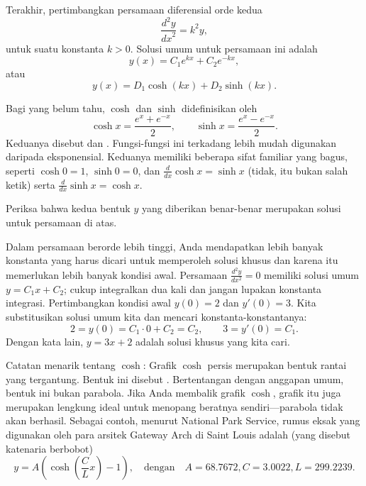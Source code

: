 Terakhir, pertimbangkan persamaan diferensial orde kedua
\begin{equation*}
\frac{d^2y}{{dx}^2} = k^2 y ,
\end{equation*}
untuk suatu konstanta $k > 0$.
Solusi umum untuk persamaan ini adalah
\begin{equation*}
y(x) = C_1 e^{kx} + C_2 e^{-kx} ,
\end{equation*}
atau
\begin{equation*}
y(x) = D_1 \cosh(kx) + D_2 \sinh(kx) .
\end{equation*}

Bagi yang belum tahu, $\cosh$ dan $\sinh$ didefinisikan oleh
\begin{equation*}
\cosh x = \frac{e^{x} + e^{-x}}{2} , \qquad
\sinh x = \frac{e^{x} - e^{-x}}{2} .
\end{equation*}
Keduanya disebut
\emph{}
dan
\emph{}.
Fungsi-fungsi ini terkadang lebih mudah
digunakan daripada eksponensial. Keduanya memiliki beberapa sifat familiar yang bagus, seperti
$\cosh 0 = 1$, $\sinh 0 = 0$, dan $\frac{d}{dx} \cosh x = \sinh x$
(tidak, itu bukan salah ketik)
serta $\frac{d}{dx} \sinh x = \cosh x$.

\begin{exercise}
Periksa bahwa kedua bentuk $y$ yang diberikan
benar-benar merupakan solusi untuk persamaan di atas.
\end{exercise}

\begin{example}
Dalam persamaan berorde lebih tinggi, Anda mendapatkan lebih banyak konstanta yang harus dicari untuk
memperoleh solusi khusus dan karena itu memerlukan lebih banyak kondisi awal.
Persamaan $\frac{d^2y}{dx^2} = 0$ memiliki
solusi umum $y = C_1 x + C_2$; cukup integralkan dua kali dan jangan lupakan
konstanta integrasi. Pertimbangkan kondisi awal $y(0) =
2$ dan $y'(0) = 3$. Kita substitusikan solusi umum kita dan mencari
konstanta-konstantanya:
\begin{equation*}
2 = y(0) = C_1 \cdot 0 + C_2 = C_2, \qquad
3 = y'(0) = C_1 .
\end{equation*}
Dengan kata lain, $y = 3x + 2$ adalah solusi khusus yang kita cari.
\end{example}


Catatan menarik tentang $\cosh$: Grafik $\cosh$ persis merupakan bentuk
rantai yang tergantung. Bentuk ini disebut
\emph{}.
Bertentangan dengan anggapan umum, bentuk ini bukan
parabola. Jika Anda membalik grafik $\cosh$, grafik itu juga merupakan lengkung ideal untuk
menopang beratnya sendiri---parabola tidak akan berhasil.
Sebagai contoh,
menurut National Park Service,
rumus eksak yang digunakan oleh
para arsitek
Gateway Arch di Saint Louis adalah
(yang disebut katenaria berbobot)
\begin{equation*}
y = A\left( \cosh \left( \frac{C}{L} x \right) - 1 \right), \quad
\text{dengan}
\quad
A=68.7672,
C=3.0022,
L = 299.2239.
\end{equation*}


